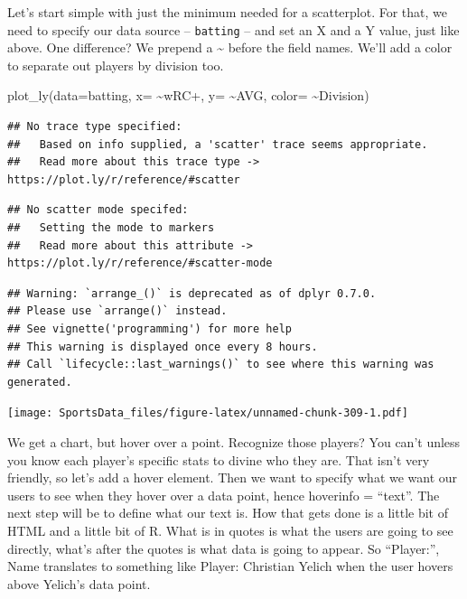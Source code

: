 \documentclass[
]{book}
\newenvironment{Shaded}{\begin{snugshade}}{\end{snugshade}}
\newcommand{\AttributeTok}[1]{\textcolor[rgb]{0.77,0.63,0.00}{#1}}
\newcommand{\FunctionTok}[1]{\textcolor[rgb]{0.00,0.00,0.00}{#1}}
\newcommand{\NormalTok}[1]{#1}
\newcommand{\SpecialCharTok}[1]{\textcolor[rgb]{0.00,0.00,0.00}{#1}}
\newcommand{\StringTok}[1]{\textcolor[rgb]{0.31,0.60,0.02}{#1}}
\begin{document}
Let's start simple with just the minimum needed for a scatterplot. For that, we need to specify our data source -- \texttt{batting} -- and set an X and a Y value, just like above. One difference? We prepend a \textasciitilde{} before the field names. We'll add a color to separate out players by division too.

\begin{Shaded}
\begin{Highlighting}[]
\FunctionTok{plot\_ly}\NormalTok{(}\AttributeTok{data=}\NormalTok{batting, }\AttributeTok{x=} \SpecialCharTok{\textasciitilde{}}\StringTok{\textasciigrave{}}\AttributeTok{wRC+}\StringTok{\textasciigrave{}}\NormalTok{, }\AttributeTok{y=} \SpecialCharTok{\textasciitilde{}}\NormalTok{AVG, }\AttributeTok{color=} \SpecialCharTok{\textasciitilde{}}\NormalTok{Division)}
\end{Highlighting}
\end{Shaded}

\begin{verbatim}
## No trace type specified:
##   Based on info supplied, a 'scatter' trace seems appropriate.
##   Read more about this trace type -> https://plot.ly/r/reference/#scatter
\end{verbatim}

\begin{verbatim}
## No scatter mode specifed:
##   Setting the mode to markers
##   Read more about this attribute -> https://plot.ly/r/reference/#scatter-mode
\end{verbatim}

\begin{verbatim}
## Warning: `arrange_()` is deprecated as of dplyr 0.7.0.
## Please use `arrange()` instead.
## See vignette('programming') for more help
## This warning is displayed once every 8 hours.
## Call `lifecycle::last_warnings()` to see where this warning was generated.
\end{verbatim}

\texttt{[image: SportsData\_files/figure-latex/unnamed-chunk-309-1.pdf]}

We get a chart, but hover over a point. Recognize those players? You can't unless you know each player's specific stats to divine who they are. That isn't very friendly, so let's add a hover element. Then we want to specify what we want our users to see when they hover over a data point, hence hoverinfo = ``text''. The next step will be to define what our text is. How that gets done is a little bit of HTML and a little bit of R. What is in quotes is what the users are going to see directly, what's after the quotes is what data is going to appear. So ``Player:'', Name translates to something like Player: Christian Yelich when the user hovers above Yelich's data point.
\end{document}

